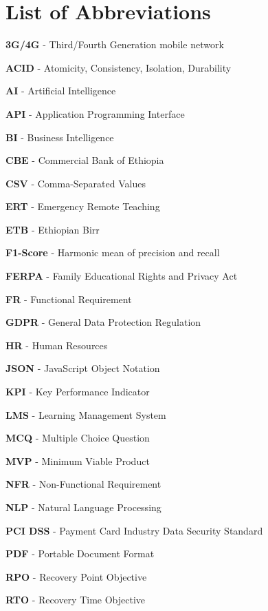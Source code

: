 \section*{List of Abbreviations}
{}
\begin{description}
    \item \textbf{3G/4G} - Third/Fourth Generation mobile network
    \item \textbf{ACID} - Atomicity, Consistency, Isolation, Durability
    \item \textbf{AI} - Artificial Intelligence
    \item \textbf{API} - Application Programming Interface
    \item \textbf{BI} - Business Intelligence
    \item \textbf{CBE} - Commercial Bank of Ethiopia
    \item \textbf{CSV} - Comma-Separated Values
    \item \textbf{ERT} - Emergency Remote Teaching
    \item \textbf{ETB} - Ethiopian Birr
    \item \textbf{F1-Score} - Harmonic mean of precision and recall
    \item \textbf{FERPA} - Family Educational Rights and Privacy Act
    \item \textbf{FR} - Functional Requirement
    \item \textbf{GDPR} - General Data Protection Regulation
    \item \textbf{HR} - Human Resources
    \item \textbf{JSON} - JavaScript Object Notation
    \item \textbf{KPI} - Key Performance Indicator
    \item \textbf{LMS} - Learning Management System
    \item \textbf{MCQ} - Multiple Choice Question
    \item \textbf{MVP} - Minimum Viable Product
    \item \textbf{NFR} - Non-Functional Requirement
    \item \textbf{NLP} - Natural Language Processing
    \item \textbf{PCI DSS} - Payment Card Industry Data Security Standard
    \item \textbf{PDF} - Portable Document Format
    \item \textbf{RPO} - Recovery Point Objective
    \item \textbf{RTO} - Recovery Time Objective

\end{description}
